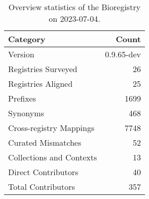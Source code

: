 \begin{table}
\caption{Overview statistics of the Bioregistry on 2023-07-04.}
\label{tab:bioregistry-summary}
\begin{tabular}{lr}
\toprule
Category & Count \\
\midrule
Version & 0.9.65-dev \\
Registries Surveyed & 26 \\
Registries Aligned & 25 \\
Prefixes & 1699 \\
Synonyms & 468 \\
Cross-registry Mappings & 7748 \\
Curated Mismatches & 52 \\
Collections and Contexts & 13 \\
Direct Contributors & 40 \\
Total Contributors & 357 \\
\bottomrule
\end{tabular}
\end{table}
